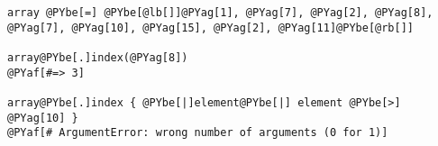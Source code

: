 \begin{Verbatim}[commandchars=@\[\]]
array @PYbe[=] @PYbe[@lb[]]@PYag[1], @PYag[7], @PYag[2], @PYag[8], @PYag[7], @PYag[10], @PYag[15], @PYag[2], @PYag[11]@PYbe[@rb[]]

array@PYbe[.]index(@PYag[8])
@PYaf[#=> 3]

array@PYbe[.]index { @PYbe[|]element@PYbe[|] element @PYbe[>] @PYag[10] }
@PYaf[# ArgumentError: wrong number of arguments (0 for 1)]
\end{Verbatim}
